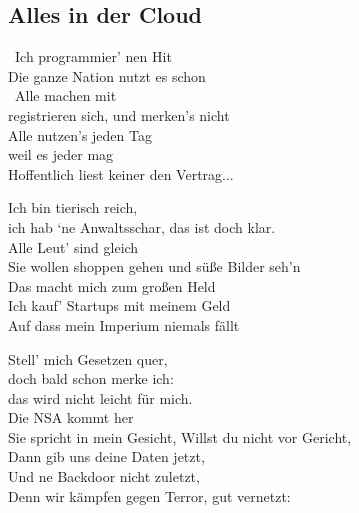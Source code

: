 \subsection{Alles in der Cloud}
 \ Ich programmier’ nen Hit \\
Die ganze Nation nutzt es schon \\
 \ Alle machen mit \\
registrieren sich, und merken’s nicht \\
Alle nutzen’s jeden Tag \\
weil es jeder mag  \\
Hoffentlich liest keiner den Vertrag... \\


Ich bin tierisch reich, \\
ich hab ‘ne Anwaltsschar, das ist doch klar. \\
Alle Leut’ sind gleich \\
Sie wollen shoppen gehen und süße Bilder seh’n \\
Das macht mich zum großen Held \\
Ich kauf’ Startups mit meinem Geld \\
Auf dass mein Imperium niemals fällt \\


Stell’ mich Gesetzen quer, \\
doch bald schon merke ich: \\
das wird nicht leicht für mich. \\
Die NSA kommt her \\
Sie spricht in mein Gesicht, \glqq Willst du nicht vor Gericht, \\
Dann gib uns deine Daten jetzt, \\
Und ne Backdoor nicht zuletzt, \\
Denn wir kämpfen gegen Terror, gut vernetzt:\grqq \\

